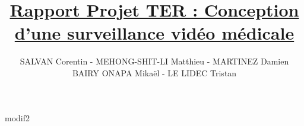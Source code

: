 \documentclass{article}
\author{SALVAN Corentin - MEHONG-SHIT-LI Matthieu - MARTINEZ Damien \\ BAIRY ONAPA Mikaël - LE LIDEC Tristan}
\title{\underline{Rapport Projet TER : Conception d'une surveillance vidéo médicale}}
\begin{document}
    \maketitle
    modif2
\end{document}

